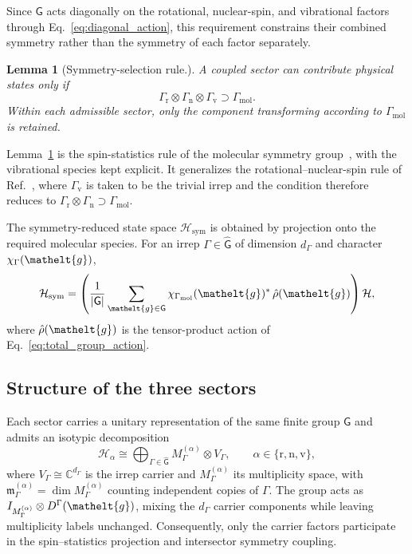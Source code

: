 \documentclass[
  reprint,
  aps,
  prx,
  superscriptaddress,
  amsmath,
  amssymb,
  longbibliography
]{revtex4-2}
\newcommand{\eltfont}[1]{{\let\sigma\eltsigma\mathelt{#1}}}
\newcommand{\grp}[1]{\mathsf{#1}}
\newcommand{\elt}[1]{\eltfont{#1}}
\newcommand{\gel}{\elt{g}}             %
\newtheorem{lemma}{Lemma}
\providecommand{\Gmol}{\Gamma_{\mathrm{mol}}}
\providecommand{\Grot}{\Gamma_{\mathrm{r}}}
\providecommand{\Gvib}{\Gamma_{\mathrm{v}}}
\providecommand{\Gspin}{\Gamma_{\mathrm{n}}}
\begin{document}
Since $\grp{G}$ acts diagonally on the rotational, nuclear-spin, and vibrational factors through Eq.~\eqref{eq:diagonal_action}, this requirement constrains their combined symmetry rather than the symmetry of each factor separately. 
\begin{lemma}[Symmetry-selection rule.]
A coupled sector can contribute physical states only if
\begin{equation}
    \Grot
    \otimes
    \Gspin
    \otimes
    \Gvib
    \supset
    \Gmol.
\end{equation}
Within each admissible sector, only the component transforming according to $\Gmol$ is retained.
\label{lemma:unified_admissibility_condition}
\end{lemma}

Lemma~\ref{lemma:unified_admissibility_condition} is the spin-statistics rule of the molecular symmetry group~\cite{LonguetHiggins1963, BunkerJensen2006}, with the vibrational species kept explicit. It generalizes the rotational--nuclear-spin rule of Ref.~\cite{albert2025quantumtheorymolecularorientations}, where $\Gvib$ is taken to be the trivial irrep and the condition therefore reduces to $\Grot\otimes\Gspin\supset\Gmol$. 

The symmetry-reduced state space $\mathcal H_{\mathrm{sym}}$ is obtained by projection onto the required molecular species. For an irrep \(\Gamma\in\widehat{\grp{G}}\) of dimension \(d_\Gamma\) and character \(\chi_\Gamma(\gel)\),
\begin{equation}
    \mathcal H_{\mathrm{sym}}
    =
    \left(\frac{1}{|\grp{G}|}
    \sum_{\gel\in\grp{G}}
    \chi_{\Gmol}(\gel)^{*}\,
    \hat{\rho}(\gel)\right)\mathcal H,
    \label{eq:full_group_projector}
\end{equation}
where \(\hat\rho(\gel)\) is the tensor-product action of Eq.~\eqref{eq:total_group_action}. 






\subsection{Structure of the three sectors}
\label{sec:isotypic}

Each sector carries a unitary representation of the same finite group $\grp{G}$ and admits an isotypic decomposition
\begin{equation}
\mathcal H_{\alpha}
\cong
\bigoplus_{\Gamma\in\widehat{\grp{G}}}
M^{(\alpha)}_{\Gamma}\otimes V_{\Gamma},
\qquad
\alpha\in\{\mathrm{r},\mathrm{n},\mathrm{v}\},
\label{eq:generic_isotypic}
\end{equation}
where $V_\Gamma\cong\mathbb C^{d_\Gamma}$ is the irrep carrier and $M^{(\alpha)}_\Gamma$ its multiplicity space, with $\mathfrak m^{(\alpha)}_\Gamma
=\dim M^{(\alpha)}_\Gamma$ counting independent copies of $\Gamma$. The group acts as $I_{M^{(\alpha)}_\Gamma}\otimes D^\Gamma(\gel)$, mixing the $d_\Gamma$ carrier components while leaving multiplicity labels unchanged. Consequently, only the carrier factors participate in the spin--statistics projection and intersector symmetry coupling.
\end{document}
